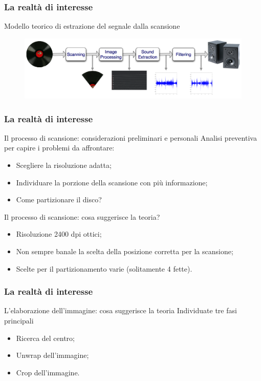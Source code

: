 \begin{frame}
\frametitle{La realtà di interesse}
\begin{block}{Modello teorico di estrazione del segnale dalla scansione}
\begin{figure}
\includegraphics[width=1\textwidth]{immagini/block-scheme.png}
\end{figure}
\end{block}
\end{frame}

\begin{frame}
\frametitle{La realtà di interesse}
\begin{block}{Il processo di scansione: considerazioni preliminari e personali}
Analisi preventiva per capire i problemi da affrontare:
\begin{itemize}
\item Scegliere la risoluzione adatta;
\item Individuare la porzione della scansione con più informazione;
\item Come partizionare il disco?
\end{itemize}
\end{block}

\begin{block}{Il processo di scansione: cosa suggerisce la teoria?}
\begin{itemize}
\item Risoluzione 2400 dpi ottici;
\item Non sempre banale la scelta della posizione corretta per la scansione;
\item Scelte per il partizionamento varie (solitamente 4 fette).
\end{itemize}
\end{block}
\end{frame}

\begin{frame}
\frametitle{La realtà di interesse}
\begin{block}{L'elaborazione dell'immagine: cosa suggerisce la teoria}
Individuate tre fasi principali
\begin{itemize}
\item Ricerca del centro;
\item Unwrap dell'immagine;
\item Crop dell'immagine.
\end{itemize}
\end{block}
\end{frame}

